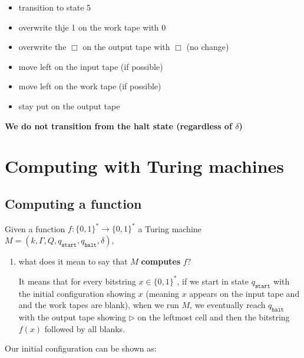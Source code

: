 \documentclass{article}
\newcommand{\qs}{q_{\texttt{start}}}
\newcommand{\qh}{q_{\texttt{halt}}}
\begin{document}
\begin{itemize}
  \item transition to state 5
  \item overwrite thje 1 on the work tape with 0
  \item overwrite the $\Box$ on the output tape with $\Box$ (no change)
  \item move left on the input tape (if possible)
  \item move left on the work tape (if possible)
        \item stay put on the output tape
\end{itemize}

\textbf{We do not transition from the halt state (regardless of $\delta$)}

\section{Computing with Turing machines}

\subsection{Computing a function}

Given a function $f : \{ 0,1 \} ^{*} \rightarrow \{ 0,1 \} ^{* }$ a Turing machine $M = (k, \Gamma, Q, q_{\texttt{start}}, q_{\texttt{halt} }, \delta)$,

\begin{enumerate}
  \item what does it mean to say that $M$ \textbf{computes} $f$?

        It means that for every bitstring $x \in \{ 0,1 \}^{*}$, if we start in state $\qs$ with the initial configuration showing $x$ (meaning $x$ appears on the input tape and and the work tapes are blank), when we run $M$, we eventually reach $\qh$ with the output tape showing $\rhd$ on the leftmost cell and then the bitstring $f(x)$ followed by all blanks.
\end{enumerate}

Our initial configuration can be shown as:
\end{document}
